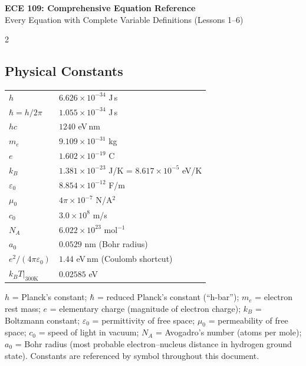 \documentclass[9pt]{extarticle}
\newcommand{\desc}[1]{{\small\color{desc}#1}}
\begin{document}
\begin{center}
{\large\bfseries\color{gold} ECE 109: Comprehensive Equation Reference}\\[2pt]
{\small Every Equation with Complete Variable Definitions (Lessons 1--6)}
\end{center}
\vspace{-4pt}

\begin{multicols}{2}


\subsection{Physical Constants}
\renewcommand{\arraystretch}{1.25}
\begin{tabular}{@{}l@{\;\;}l@{}}
$h$ & $6.626\times10^{-34}$ J\,s \\
$\hbar = h/2\pi$ & $1.055\times10^{-34}$ J\,s \\
$hc$ & $1240$ eV\,nm \\
$m_e$ & $9.109\times10^{-31}$ kg \\
$e$ & $1.602\times10^{-19}$ C \\
$k_B$ & $1.381\times10^{-23}$ J/K = $8.617\times10^{-5}$ eV/K \\
$\varepsilon_0$ & $8.854\times10^{-12}$ F/m \\
$\mu_0$ & $4\pi\times10^{-7}$ N/A$^2$ \\
$c_0$ & $3.0\times10^{8}$ m/s \\
$N_A$ & $6.022\times10^{23}$ mol$^{-1}$ \\
$a_0$ & $0.0529$ nm (Bohr radius) \\
$e^2/(4\pi\varepsilon_0)$ & $1.44$ eV\,nm (Coulomb shortcut) \\
$k_BT|_{300\text{K}}$ & $0.02585$ eV \\
\end{tabular}
\renewcommand{\arraystretch}{1.0}

\desc{$h$ = Planck's constant; $\hbar$ = reduced Planck's constant (``h-bar''); $m_e$ = electron rest mass; $e$ = elementary charge (magnitude of electron charge); $k_B$ = Boltzmann constant; $\varepsilon_0$ = permittivity of free space; $\mu_0$ = permeability of free space; $c_0$ = speed of light in vacuum; $N_A$ = Avogadro's number (atoms per mole); $a_0$ = Bohr radius (most probable electron--nucleus distance in hydrogen ground state). Constants are referenced by symbol throughout this document.}


\end{multicols}
\end{document}
